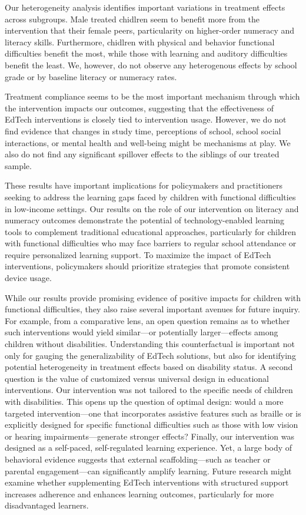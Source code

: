\documentclass[hidelinks,12pt]{article}
\begin{document}
\begin{singlespace}
Our heterogeneity analysis identifies important variations in treatment effects across subgroups. Male treated chidlren seem to benefit more from the intervention that their female peers, particularity on higher-order numeracy and literacy skills. Furthermore, chidlren with physical and behavior functional difficulties benefit the most, while those with learning and auditory difficulties benefit the least. We, however, do not observe any heterogenous effects by school grade or by baseline literacy or numeracy rates. 

Treatment compliance seems to be the most important mechanism through which the intervention impacts our outcomes, suggesting that the effectiveness of EdTech interventions is closely tied to intervention usage. However, we do not find  evidence that changes in study time, perceptions of school, school social interactions, or mental health and well-being might be mechanisms at play. We also do not find any significant spillover effects to the siblings of our treated sample. 

These results have important implications for policymakers and practitioners seeking to address the learning gaps faced by children with functional difficulties in low-income settings. Our results on the role of our intervention on literacy and numeracy outcomes demonstrate the potential of technology-enabled learning tools to complement traditional educational approaches, particularly for children with functional difficulties who may face barriers to regular school attendance or require personalized learning support. To maximize the impact of EdTech interventions, policymakers should prioritize strategies that promote consistent device usage.

While our results provide promising evidence of positive impacts for children with functional difficulties, they also raise several important avenues for future inquiry. For example, from a comparative lens, an open question remains as to whether such interventions would yield similar—or potentially larger—effects among children without disabilities. Understanding this counterfactual is important not only for gauging the generalizability of EdTech solutions, but also for identifying potential heterogeneity in treatment effects based on disability status. A second question is the value of customized versus universal design in educational interventions. Our intervention was not tailored to the specific needs of children with disabilities. This opens up the question of optimal design: would a more targeted intervention—one that incorporates assistive features such as braille or is explicitly designed for specific functional difficulties such as those with low vision or hearing impairments—generate stronger effects? Finally, our intervention was designed as a self-paced, self-regulated learning experience. Yet, a large body of behavioral evidence suggests that external scaffolding—such as teacher or parental engagement—can significantly amplify learning. Future research might examine whether supplementing EdTech interventions with structured support increases adherence and enhances learning outcomes, particularly for more disadvantaged learners.
\newpage


\end{singlespace}
\end{document}
